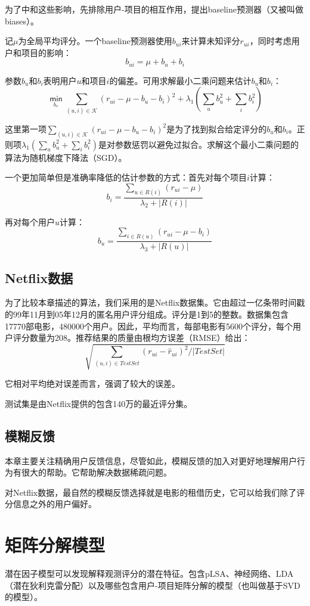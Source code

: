 \documentclass{article}
\begin{document}
 为了中和这些影响，先排除用户-项目的相互作用，提出baseline预测器（又被叫做biases）。

 记$\mu$为全局平均评分。一个baseline预测器使用$b_{ui}$来计算未知评分$r_{ui}$，同时考虑用户和项目的影响：
 $$ b_{ui}=\mu+b_u+b_i $$

 参数$b_u$和$b_i$表明用户$u$和项目$i$的偏差。可用求解最小二乘问题来估计$b_u$和$b_i$：
 $$ \mathop{\mathsf{min}}\limits_{b_{*}}\mathop{\sum}\limits_{(u,i)\in\mathcal{K}}(r_{ui}-\mu-b_u-b_i)^2+\lambda_1(\mathop{\sum}\limits_{u}b_u^2+\mathop{\sum}\limits_{i}b_i^2) $$

 这里第一项$\mathop{\sum}_{(u,i)\in\mathcal{K}}(r_{ui}-\mu-b_u-b_i)^2$是为了找到拟合给定评分的$b_u$和$b_i$。正则项$\lambda_1(\mathop{\sum}_{u}b_u^2+\mathop{\sum}_{i}b_i^2)$是对参数惩罚以避免过拟合。求解这个最小二乘问题的算法为随机梯度下降法（SGD）。

 一个更加简单但是准确率降低的估计参数的方式：首先对每个项目$i$计算：
 $$ b_i=\frac{\mathop{\sum}_{u\in R(i)}(r_{ui}-\mu)}{\lambda_2+|R(i)|} $$

 再对每个用户$u$计算：
 $$ b_u=\frac{\mathop{\sum}_{i\in R(u)}(r_{ui}-\mu-b_i)}{\lambda_3+|R(u)|} $$

 \subsection{Netflix数据}
 为了比较本章描述的算法，我们采用的是Netflix数据集。它由超过一亿条带时间戳的99年11月到05年12月的匿名用户评分组成。评分是1到5的整数。数据集包含17770部电影，480000个用户。因此，平均而言，每部电影有5600个评分，每个用户评分数量为208。推荐结果的质量由根均方误差（RMSE）给出：
 $$ \sqrt{\mathop{\sum}\limits_{(u,i)\in TestSet}(r_{ui}-\hat{r}_{ui})^2/|TestSet|} $$

 它相对平均绝对误差而言，强调了较大的误差。

 测试集是由Netflix提供的包含140万的最近评分集。

 \subsection{模糊反馈}
 本章主要关注精确用户反馈信息，尽管如此，模糊反馈的加入对更好地理解用户行为有很大的帮助。它帮助解决数据稀疏问题。

 对Netflix数据，最自然的模糊反馈选择就是电影的租借历史，它可以给我们除了评分信息之外的用户偏好。

 \section{矩阵分解模型}
 潜在因子模型可以发现解释观测评分的潜在特征。包含pLSA、神经网络、LDA（潜在狄利克雷分配）以及哪些包含用户-项目矩阵分解的模型（也叫做基于SVD的模型）。
\end{document}
